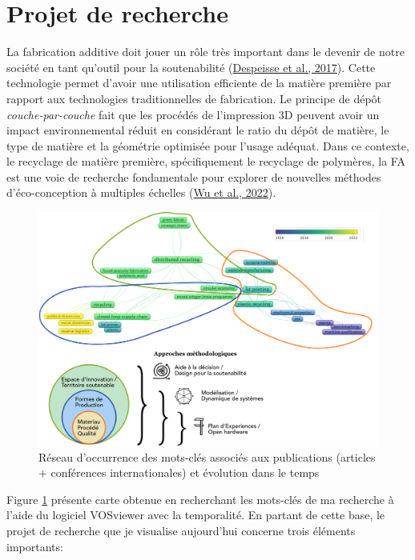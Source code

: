 \documentclass[
  12pt,
  oneside]{book}
\begin{document}
\hypertarget{projet-de-recherche}{%
\section{Projet de recherche}\label{projet-de-recherche}}

La fabrication additive doit jouer un rôle très important dans le devenir de notre société en tant qu'outil pour la soutenabilité (\protect\hyperlink{ref-Despeisse2016}{Despeisse et al., 2017}). Cette technologie permet d'avoir une utilisation efficiente de la matière première par rapport aux technologies traditionnelles de fabrication. Le principe de dépôt \emph{couche-par-couche} fait que les procédés de l'impression 3D peuvent avoir un impact environnemental réduit en considérant le ratio du dépôt de matière, le type de matière et la géométrie optimisée pour l'usage adéquat. Dans ce contexte, le recyclage de matière première, spécifiquement le recyclage de polymères, la FA est une voie de recherche fondamentale pour explorer de nouvelles méthodes d'éco-conception à multiples échelles (\protect\hyperlink{ref-Wu2021a}{Wu et al., 2022}).

\begin{figure}

{\centering \includegraphics[width=0.9\linewidth]{Figures/Vosviewer/Vosviewer-Fabio} 

}

\caption{Réseau d’occurrence des mots-clés associés aux publications (articles + conférences internationales) et évolution dans le temps}\label{fig:vosviewer}
\end{figure}

Figure \ref{fig:vosviewer} présente carte obtenue en recherchant les mots-clés de ma recherche à l'aide du logiciel VOSviewer avec la temporalité. En partant de cette base, le projet de recherche que je visualise aujourd'hui concerne trois éléments importants:
\end{document}
